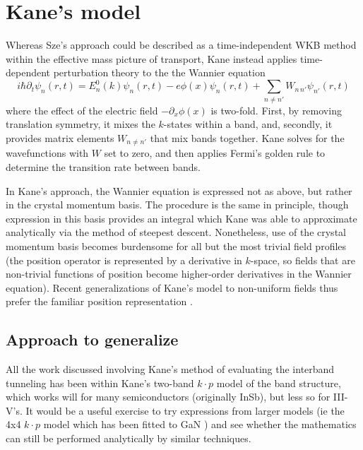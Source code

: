 \section{Kane's model}
Whereas Sze's approach could be described as a time-independent WKB method within the effective mass picture of transport, Kane instead applies time-dependent perturbation theory to the the Wannier equation
$$i\hbar\partial_t\psi_n(r,t)=E_n^0(k)\psi_n(r,t)-e\phi(x)\psi_n(r,t)+\sum_{n\neq n'} W_{n\,n'}\psi_{n'}(r,t)$$
where the effect of the electric field $-\partial_x\phi(x)$ is two-fold.  First, by removing translation symmetry, it mixes the $k$-states within a band, and, secondly, it provides matrix elements $W_{n\neq n'}$ that mix bands together.  Kane solves for the wavefunctions with $W$ set to zero, and then applies Fermi's golden rule to determine the transition rate between bands.

In Kane's approach, the Wannier equation is expressed not as above, but rather in the crystal momentum basis.  The procedure is the same in principle, though expression in this basis provides an integral which Kane was able to approximate analytically via the method of steepest descent.  Nonetheless, use of the crystal momentum basis becomes burdensome for all but the most trivial field profiles (the position operator is represented by a derivative in $k$-space, so fields that are non-trivial functions of position become higher-order derivatives in the Wannier equation).  Recent generalizations of Kane's model to non-uniform fields thus prefer the familiar position representation \cite{Tanaka_1994}.

\subsection{Approach to generalize}
All the work discussed involving Kane's method of evaluating the interband tunneling has been within Kane's two-band $k\cdot p$ model of the band structure, which works will for many semiconductors (originally InSb), but less so for III-V's.  It would be a useful exercise to try expressions from larger models (ie the 4x4 $k\cdot p$ model which has been fitted to GaN \cite{Rinke_2008}) and see whether the mathematics can still be performed analytically by similar techniques.